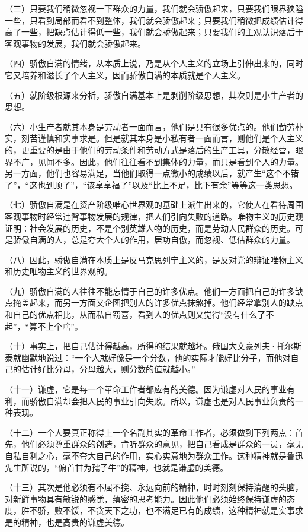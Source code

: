 （三）只要我们稍微忽视一下群众的力量，我们就会骄傲起来，只要我们眼界狭隘一些，只看到局部而看不到整体，我们就会骄傲起来；只要我们稍微把成绩估计得高了一些，把缺点估计得低一些，我们就会骄傲起来；只要我们的主观认识落后于客观事物的发展，我们就会骄傲起来。

（四）骄傲自满的情绪，从本质上说，乃是从个人主义的立场上引伸出来的，同时它又培养和滋长了个人主义，因而骄傲自满的本质就是个人主义。

（五）就阶级根源来分析，骄傲自满基本上是剥削阶级思想，其次则是小生产者的思想。

（六）小生产者就其本身是劳动者一面而言，他们是具有很多优点的。他们勤劳朴实，刻苦谨慎和实事求是。但是就其本身是小私有者一面而言，则他们是个人主义的，更重要的是由于他们的劳动条件和劳动方式是落后的生产工具，分散经营，眼界不广，见闻不多。因此，他们往往看不到集体的力量，而只是看到个人的力量。另一方面，他们也容易满足，当他们取得一点微小的成绩以后，就产生“这个不错了”，“这也到顶了”，“该享享福了”以及“比上不足，比下有余”等等这一类思想。

（七）骄傲自满是在资产阶级唯心世界观的基础上派生出来的，它使人在看待周围客观事物时经常违背事物发展的规律，把人们引向失败的道路。唯物主义的历史观证明：社会发展的历史，不是个别英雄人物的历史，而是劳动人民群众的历史。可是骄傲自满的人，总是夸大个人的作用，居功自傲，而忽视、低估群众的力量。

（八）因此，骄傲自满在本质上是反马克思列宁主义的，是反对党的辩证唯物主义和历史唯物主义的世界观的。

（九）骄傲自满的人往往不能忘情于自己的许多优点。他们一方面把自己的许多缺点掩盖起来，而另一方面又企图把别人的许多优点抹煞掉。他们经常拿别人的缺点和自己的优点相比，从而私自窃喜，看到人的优点则又觉得“没有什么了不起”，“算不上个啥”。

（十）事实上，把自己估计得越高，所得的结果就越坏。俄国大文豪列夫·托尔斯泰就幽默地说过：“一个人就好像是一个分数，他的实际才能好比分子，而他对自己的估计好比分母，分母越大，则分数的值就越小。”

（十一）谦虚，它是每一个革命工作者都应有的美德。因为谦虚对人民的事业有利，而骄傲自满却会把人民的事业引向失败。所以，谦虚也是对人民事业负责的一种表现。

（十二）一个人要真正称得上一个名副其实的革命工作者，必须做到下列两点：首先，他们必须尊重群众的创造，肯听群众的意见，把自己看成是群众的一员，毫无自私自利之心，毫不夸大自己的作用，实心实意地为群众工作。这种精神就是鲁迅先生所说的，“俯首甘为孺子牛”的精神，也就是谦虚的美德。

（十三）其次是他必须有不屈不挠、永远向前的精神，时时刻刻保持清醒的头脑，对新鲜事物具有敏锐的感觉，缜密的思考能力。因此他们必须始终保持谦虚的态度，胜不骄，败不馁，不贪天下之功，也不满足已有的成绩，这种精神就是实事求是的精神，也是高贵的谦虚美德。

